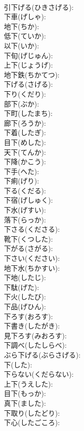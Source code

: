 \documentclass[8pt]{extreport}
\begin{document}
\begin{CJK}{UTF8}{min}
\\	引下げる(ひきさげる): 
\\	下車(げしゃ): 
\\	地下(ちか): 
\\	低下(ていか): 
\\	以下(いか): 
\\	下旬(げじゅん): 
\\	上下(じょうげ): 
\\	地下鉄(ちかてつ): 
\\	下げる(さげる): 
\\	下り(くだり): 
\\	部下(ぶか): 
\\	下町(したまち): 
\\	廊下(ろうか): 
\\	下着(したぎ): 
\\	目下(めした): 
\\	天下(てんか): 
\\	下降(かこう): 
\\	下手(へた): 
\\	下痢(げり): 
\\	下る(くだる): 
\\	下宿(げしゅく): 
\\	下水(げすい): 
\\	落下(らっか): 
\\	下さる(くださる): 
\\	靴下(くつした): 
\\	下がる(さがる): 
\\	下さい(ください): 
\\	地下水(ちかすい): 
\\	下地(したじ): 
\\	下駄(げた): 
\\	下火(したび): 
\\	下品(げひん): 
\\	下ろす(おろす): 
\\	下書き(したがき): 
\\	見下ろす(みおろす): 
\\	下調べ(したしらべ): 
\\	ぶら下げる(ぶらさげる): 
\\	下(した): 
\\	下らない(くだらない): 
\\	上下(うえした): 
\\	目下(もっか): 
\\	真下(ました): 
\\	下取り(したどり): 
\\	下心(したごころ): 

\end{CJK}
\end{document}
